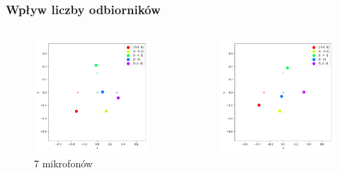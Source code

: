 \begin{frame}{}
    \frametitle{Wpływ liczby odbiorników}
    \begin{columns}
        \begin{column}{0.5\textwidth}
            \begin{figure}
                \centering
                \includegraphics[width=\textwidth]{../pics/mult_lat_2d_num/positions_7_mean.png}
                \caption{7 mikrofonów}
            \end{figure}
        \end{column}
        \begin{column}{0.5\textwidth}
            \begin{figure}
                \centering
                \includegraphics[width=\textwidth]{../pics/mult_lat_2d_num/positions_8_mean.png}

\end{figure}
\end{column}
\end{columns}
\end{frame}
